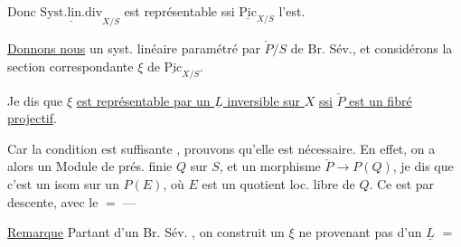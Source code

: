 Donc $\underline{\mathrm{Syst.lin.div}}_{X/S}$ est représentable ssi $\underline{\mathrm{Pic}}_{X/S}$ l'est.

\uline{Donnons nous} un syst. linéaire paramétré par $\check{P}/S$ de Br. Sév., et considérons la section correspondante $\xi$ de $\underline{\mathrm{Pic}}_{X/S}$.

Je dis que $\xi$ \uline{est représentable par un $\underline L$ inversible sur $X$} \uline{ssi} \uline{$\check P$ est un fibré projectif}.
\margin{[$f:X\to S$ propre, $f_*(O_X)=O_S$ \unsure{univ\textsuperscript{t}}]}

Car la condition est suffisante , prouvons qu'elle est nécessaire.  En effet, on a alors un Module de prés. finie $Q$ sur $S$, et un morphisme $\check P\longrightarrow P(Q)$, je dis que c'est un isom sur un $P(E)$, où $E$ est un quotient loc. libre de $Q$. Ce est par descente, avec le $=$  ---



\uline{Remarque} Partant d'un Br. Sév. , on construit un $\xi$ ne provenant pas d'un $\underline L$  $=$ 
